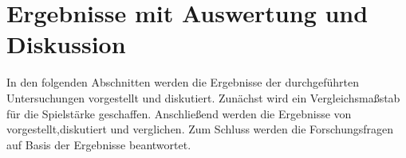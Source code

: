 \chapter{Ergebnisse mit Auswertung und Diskussion}
In den folgenden Abschnitten werden die Ergebnisse der durchgeführten Untersuchungen vorgestellt und diskutiert. Zunächst wird ein Vergleichsmaßstab für die Spielstärke geschaffen. 
Anschließend werden die Ergebnisse von \bothAlgs vorgestellt,diskutiert und verglichen. 
Zum Schluss werden die Forschungsfragen auf Basis der Ergebnisse beantwortet.




